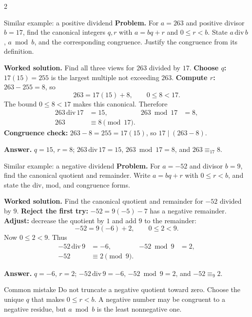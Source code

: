 \documentclass[10pt]{article}
\newcommand{\equivmod}[1]{\mathrel{\equiv_{#1}}}
\begin{document}
\begin{multicols}{2}
\begin{workedbox}{Similar example: a positive dividend}
\textbf{Problem.} For $a=263$ and positive divisor $b=17$, find the canonical integers $q,r$ with $a=bq+r$ and $0\le r<b$. State $a\,\mathrm{div}\,b$, $a\bmod b$, and the corresponding congruence. Justify the congruence from its definition.

\textbf{Worked solution.} Find all three views for $263$ divided by $17$.
\textbf{Choose $q$:} $17(15)=255$ is the largest multiple not exceeding $263$.
\textbf{Compute $r$:} $263-255=8$, so
\[
263=17(15)+8,\qquad 0\le8<17.
\]
The bound $0\le8<17$ makes this canonical. Therefore
\[
\begin{aligned}
263\,\mathrm{div}\,17&=15, & 263\bmod17&=8,\\
263&\equiv8\pmod{17}.
\end{aligned}
\]
\textbf{Congruence check:}
$263-8=255=17(15)$, so $17\mid(263-8)$.

\textbf{Answer.} $q=15$, $r=8$; $263\,\mathrm{div}\,17=15$, $263\bmod17=8$, and $263\equivmod{17}8$.
\end{workedbox}

\begin{workedbox}{Similar example: a negative dividend}
\textbf{Problem.} For $a=-52$ and divisor $b=9$, find the canonical quotient and remainder. Write $a=bq+r$ with $0\le r<b$, and state the div, mod, and congruence forms.

\textbf{Worked solution.} Find the canonical quotient and remainder for $-52$ divided by $9$.
\textbf{Reject the first try:} $-52=9(-5)-7$ has a negative remainder.
\textbf{Adjust:} decrease the quotient by $1$ and add $9$ to the remainder:
\[
-52=9(-6)+2,\qquad 0\le2<9.
\]
Now $0\le2<9$. Thus
\[
\begin{aligned}
-52\,\mathrm{div}\,9&=-6, & -52\bmod9&=2,\\
-52&\equiv2\pmod9.
\end{aligned}
\]

\textbf{Answer.} $q=-6$, $r=2$; $-52\,\mathrm{div}\,9=-6$, $-52\bmod9=2$, and $-52\equivmod9 2$.
\end{workedbox}

\begin{warningbox}{Common mistake}
Do not truncate a negative quotient toward zero. Choose the unique $q$ that
makes $0\le r<b$. A negative number may be congruent to a negative residue,
but $a\bmod b$ is the least nonnegative one.
\end{warningbox}


\end{multicols}
\end{document}
